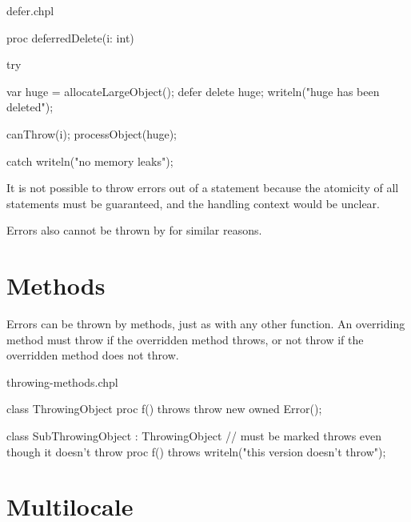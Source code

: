 \begin{chapelexample}{defer.chpl}
\begin{chapel}
proc deferredDelete(i: int) {
  try {
    var huge = allocateLargeObject();
    defer {
      delete huge;
      writeln("huge has been deleted");
    }

    canThrow(i);
    processObject(huge);
  } catch {
    writeln("no memory leaks");
  }
}
\end{chapel}
\begin{chapelpost}
\end{chapelpost}
\begin{chapeloutput}
\end{chapeloutput}
\end{chapelexample}

It is not possible to throw errors out of a  statement because the
atomicity of all  statements must be guaranteed, and the handling
context would be unclear.

Errors also cannot be thrown by  for similar reasons.

\section{Methods}
\label{Errors_Methods}

Errors can be thrown by methods, just as with any other function.
An overriding method must throw if the overridden method throws,
or not throw if the overridden method does not throw.

\begin{chapelexample}{throwing-methods.chpl}
\begin{chapel}
class ThrowingObject {
  proc f() throws {
    throw new owned Error();
  }
}

class SubThrowingObject : ThrowingObject {
  // must be marked throws even though it doesn't throw
  proc f() throws {
    writeln("this version doesn't throw");
  }
}
\end{chapel}
\begin{chapelpost}
\end{chapelpost}
\begin{chapeloutput}
\end{chapeloutput}
\end{chapelexample}

\section{Multilocale}
\label{Errors_Multilocale}

